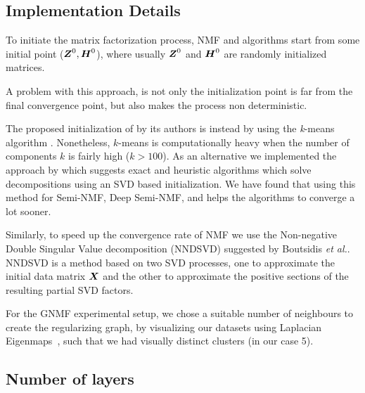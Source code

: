 \documentclass[10pt,journal,compsoc]{IEEEtran}
\def\etal{{\it et al.}}
\begin{document}
\subsection{Implementation Details}
To initiate the matrix factorization process, NMF and \seminmf algorithms start from some initial point ($\boldsymbol Z^0, \boldsymbol H^0$), where usually $\boldsymbol Z^0$ and $\boldsymbol H^0$ are randomly initialized matrices. 

A problem with this approach, is not only the initialization point is far from the final convergence point, but also makes the process non deterministic.

The proposed initialization of \seminmf by its authors is instead by using the \emph{k}-means algorithm \cite{Ding2010}. Nonetheless, $k$-means is computationally heavy when the number of components $k$ is fairly high ($k>100$). As an alternative we implemented the approach by \cite{gillis2014exact} which suggests exact and heuristic algorithms which solve \seminmf decompositions using an SVD based initialization. We have found that using this method for Semi-NMF, Deep Semi-NMF, and \wsf{} helps the algorithms to converge a lot sooner.

Similarly, to speed up the convergence rate of NMF we use the Non-negative Double Singular Value decomposition (NNDSVD) suggested by Boutsidis \etal \citet{boutsidis2008svd}. NNDSVD is a method based on
two SVD processes, one to approximate the initial data matrix $\boldsymbol X$ and the other to approximate the positive sections of the resulting partial SVD factors. 

For the GNMF experimental setup, we chose a suitable number of neighbours to create the regularizing graph, by visualizing our datasets using Laplacian Eigenmaps~\cite{belkin2001laplacian}, such that we had visually distinct clusters (in our case 5).



\subsection{Number of layers}
\end{document}
